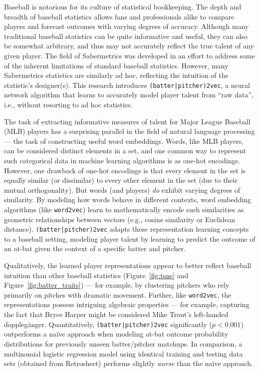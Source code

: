 \documentclass{article}
\begin{document}
\begin{center}

\end{center}

Baseball is notorious for its culture of statistical bookkeeping. The depth and breadth of baseball statistics allows fans and professionals alike to compare players and forecast outcomes with varying degrees of accuracy. Although many traditional baseball statistics can be quite informative and useful, they can also be somewhat arbitrary, and thus may not accurately reflect the true talent of any given player. The field of Sabermetrics was developed in an effort to address some of the inherent limitations of standard baseball statistics. However, many Sabermetrics statistics are similarly ad hoc, reflecting the intuition of the statistic's designer(s). This research introduces \texttt{(batter|pitcher)2vec}, a neural network algorithm that learns to accurately model player talent from ``raw data'', i.e., without resorting to ad hoc statistics.

The task of extracting informative measures of talent for Major League Baseball (MLB) players has a surprising parallel in the field of natural language processing --- the task of constructing useful word embeddings. Words, like MLB players, can be considered distinct elements in a set, and one common way to represent such categorical data in machine learning algorithms is as one-hot encodings. However, one drawback of one-hot encodings is that every element in the set is equally similar (or dissimilar) to every other element in the set (due to their mutual orthogonality). But words (and players) \emph{do} exhibit varying degrees of similarity. By modeling how words behave in different contexts, word embedding algorithms (like \texttt{word2vec}) learn to mathematically encode such similarities as geometric relationships between vectors (e.g., cosine similarity or Euclidean distance). \texttt{(batter|pitcher)2vec} adapts these representation learning concepts to a baseball setting, modeling player talent by learning to predict the outcome of an at-bat given the context of a specific batter and pitcher.

Qualitatively, the learned player representations appear to better reflect baseball intuition than other baseball statistics (Figure~\ref{fig:tsne} and Figure~\ref{fig:batter_traits}) --- for example, by clustering pitchers who rely primarily on pitches with dramatic movement. Further, like \texttt{word2vec}, the representations possess intriguing algebraic properties --- for example, capturing the fact that Bryce Harper might be considered Mike Trout's left-handed dopplegänger. Quantitatively, \texttt{(batter|pitcher)2vec} significantly ($p < 0.001$) outperforms a naïve approach when modeling at-bat outcome probability distributions for previously unseen batter/pitcher matchups. In comparison, a multinomial logistic regression model using identical training and testing data sets (obtained from Retrosheet) performs slightly \emph{worse} than the naïve approach.
\end{document}
